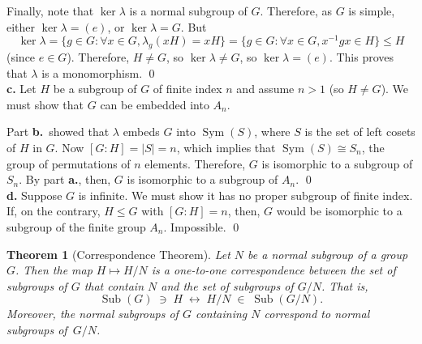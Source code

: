 \documentclass[12pt]{article}
\theoremstyle{plain}
\newtheorem{theorem} {Theorem}
\theoremstyle{definition}
\theoremstyle{remark}
\theoremstyle{remark}
\numberwithin{theorem}{section}
\numberwithin{equation}{section}
\newcommand{\<}{\ensuremath{\langle}}
\renewcommand{\>}{\ensuremath{\rangle}}
\renewcommand{\leq}{\ensuremath{\leqslant}}
\newcommand{\Sub}{\ensuremath{\operatorname{Sub}}}     %
\newcommand{\Sym}{\ensuremath{\operatorname{Sym}}}
\begin{document}
{\begin{solution}
      Finally, note that $\ker \lambda$ is a normal subgroup of $G$.  Therefore, as $G$ is simple,
      either $\ker \lambda = (e)$, or $\ker \lambda = G$.  But
      \[
      \ker \lambda = \{g\in G: \forall x\in G, \lambda_g(xH) = xH\} = 
      \{g\in G: \forall x\in G, x^{-1}g x \in H\} \leq H
      \]
      (since $e\in G$).  Therefore, $H\neq G$, so $\ker \lambda \neq G$, so 
      $\ker \lambda =(e)$.  This proves that $\lambda$ is a monomorphism.
      \qed
      ~\\[4pt]
      {\bf c.} Let $H$ be a subgroup of $G$ of finite index $n$ and assume $n>1$ (so $H
      \neq G$).  We must show that $G$ can be embedded into $A_n$.

      Part {\bf b.}~showed that $\lambda$ embeds $G$ into $\Sym(S)$, where $S$ is the set
      of left cosets of $H$ in $G$.  Now $[G:H] = |S| = n$, which implies
      that $\Sym(S) \cong S_n$, the group of permutations of $n$ elements.  Therefore,
      $G$ is isomorphic to a subgroup of $S_n$.  By part {\bf a.}, then, $G$ is isomorphic
      to a subgroup of $A_n$. \qed
      ~\\[4pt]
      {\bf d.} Suppose $G$ is infinite.  We must show it has no proper subgroup of finite
      index.  If, on the contrary, $H\leq G$ with $[G:H] = n$, then, $G$ would be isomorphic
      to a subgroup of the finite group $A_n$. Impossible. \qed
     \end{solution}
}




\begin{theorem}[Correspondence Theorem]\label{CorrespondTheorem}
Let $N$ be a normal subgroup of a group $G$. Then the map
$H \mapsto H/N$
is a one-to-one correspondence between the set of subgroups of $G$ that contain 
$N$ and the set of subgroups of $G/N$. That is,
\[
\Sub(G) \; \ni \; H \; \longleftrightarrow \; H/N \; \in \; \Sub(G/N).
\]
Moreover, the
normal subgroups of $G$ containing $N$ correspond to normal subgroups of~$G/N$. 
\end{theorem}

 
\end{document}
